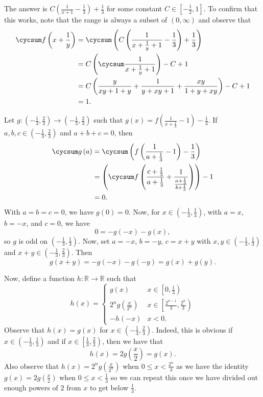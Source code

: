 The answer is $\boxed{C\left(\frac{1}{x+1}-\frac{1}{3}\right)+\frac{1}{3}}$ for some constant $C\in\left[-\frac{1}{2},1\right]$. To confirm that this works, note that the range is always a subset of $\left(0,\infty\right)$ and observe that
\begin{align*}
	\cycsum f\left(x+\frac{1}{y}\right)&=\cycsum\left(C\left(\frac{1}{x+\frac{1}{y}+1}-\frac{1}{3}\right)+\frac{1}{3}\right)\\
	&=C\left(\cycsum\frac{1}{x+\frac{1}{y}+1}\right)-C+1\\
	&=C\left(\frac{y}{xy+1+y}+\frac{1}{y+xy+1}+\frac{xy}{1+y+xy}\right)-C+1\\
	&=1.
\end{align*}

Let $g:\left(-\frac{1}{3},\frac{2}{3}\right)\to\left(-\frac{1}{3},\frac{2}{3}\right)$ such that $g\left(x\right)=f\left(\frac{1}{x+\frac{1}{3}}-1\right)-\frac{1}{3}$. If $a,b,c\in\left(-\frac{1}{3},\frac{2}{3}\right)$ and $a+b+c=0$, then
\begin{align*}
	\cycsum g\left(a\right)&=\cycsum\left(f\left(\frac{1}{a+\frac{1}{3}}-1\right)-\frac{1}{3}\right)\\
	&=\left(\cycsum f\left(\frac{c+\frac{1}{3}}{a+\frac{1}{3}}+\frac{1}{\frac{a+\frac{1}{3}}{b+\frac{1}{3}}}\right)\right)-1\\
	&=0.
\end{align*}
With $a=b=c=0$, we have $g\left(0\right)=0$. Now, for $x\in\left(-\frac{1}{3},\frac{1}{3}\right)$, with $a=x$, $b=-x$, and $c=0$, we have \[0=-g\left(-x\right)-g\left(x\right),\] so $g$ is odd on $\left(-\frac{1}{3},\frac{1}{3}\right)$. Now, set $a=-x$, $b=-y$, $c=x+y$ with $x,y\in\left(-\frac{1}{3},\frac{1}{3}\right)$ and $x+y\in\left(-\frac{1}{3},\frac{2}{3}\right)$. Then \[g\left(x+y\right)=-g\left(-x\right)-g\left(-y\right)=g\left(x\right)+g\left(y\right).\]

Now, define a function $h:\mathbb{R}\to\mathbb{R}$ such that \[h\left(x\right)=\begin{cases}g\left(x\right) & x\in\left[0,\frac{1}{3}\right)\\2^ng\left(\frac{x}{2^n}\right) & x\in\left[\frac{2^{n-1}}{3},\frac{2^n}{3}\right)\\-h\left(-x\right) & x<0.\end{cases}\] Observe that $h\left(x\right)=g\left(x\right)$ for $x\in\left(-\frac{1}{3},\frac{2}{3}\right)$. Indeed, this is obvious if $x\in\left(-\frac{1}{3},\frac{1}{3}\right)$ and if $x\in\left[\frac{1}{3},\frac{2}{3}\right)$, then we have that \[h\left(x\right)=2g\left(\frac{x}{2}\right)=g\left(x\right).\] Also observe that $h\left(x\right)=2^ng\left(\frac{x}{2^n}\right)$ when $0\leq x<\frac{2^n}{3}$ as we have the identity $g\left(x\right)=2g\left(\frac{x}{2}\right)$ when $0\leq x<\frac{1}{3}$ so we can repeat this once we have divided out enough powers of $2$ from $x$ to get below $\frac{1}{3}$.

